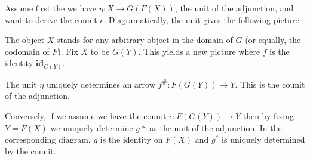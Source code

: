 \documentclass{article}
\newcommand{\id}{\mathbf{id}}
\begin{document}
\begin{enumerate}
\subitem
  Assume first the we have $\eta : X \rightarrow G(F(X))$, the unit of the adjunction, and want to derive the counit $\epsilon$.
  Diagramatically, the unit gives the following picture.
  \begin{center}
  \end{center}
\subitem
  The object $X$ stands for any arbitrary object in the domain of $G$ (or equally, the codomain of $F$).
  Fix $X$ to be $G(Y)$.
  This yields a new picture where $f$ is the identity $\id_{G(Y)}$.
  \begin{center}
  \end{center}
\subitem
  The unit $\eta$ uniquely determines an arrow $f^{\#} : F(G(Y)) \rightarrow Y$.
  This is the counit of the adjunction. %

\subitem
  Conversely, if we assume we have the counit $\epsilon : F(G(Y)) \rightarrow Y$ then by fixing $Y = F(X)$ we uniquely determine $g*$ as the unit of the adjunction.
  In the corresponding diagram, $g$ is the identity on $F(X)$ and $g^*$ is uniquely determined by the counit.


\end{enumerate}
\end{document}
